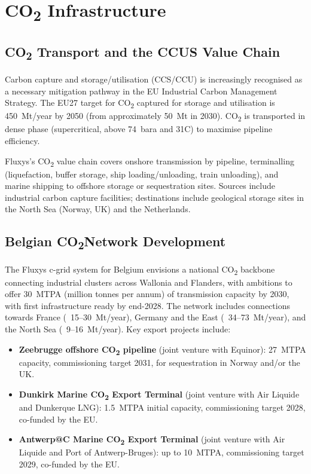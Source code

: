 \section{CO\texorpdfstring{\textsubscript{2}}{2} Infrastructure}

\subsection{CO\texorpdfstring{\textsubscript{2}}{2} Transport and the CCUS Value Chain}

Carbon capture and storage/utilisation (CCS/CCU) is increasingly recognised as a necessary mitigation pathway in the EU Industrial Carbon Management Strategy. The EU27 target for CO\textsubscript{2} captured for storage and utilisation is 450~Mt/year by 2050 (from approximately 50~Mt in 2030). CO\textsubscript{2} is transported in dense phase (supercritical, above 74~bara and 31\textdegree C) to maximise pipeline efficiency.

Fluxys's CO\textsubscript{2} value chain covers onshore transmission by pipeline, terminalling (liquefaction, buffer storage, ship loading/unloading, train unloading), and marine shipping to offshore storage or sequestration sites. Sources include industrial carbon capture facilities; destinations include geological storage sites in the North Sea (Norway, UK) and the Netherlands.

\subsection{Belgian CO\texorpdfstring{\textsubscript{2}}{2}Network Development}

The Fluxys c-grid system for Belgium envisions a national CO\textsubscript{2} backbone connecting industrial clusters across Wallonia and Flanders, with ambitions to offer 30~MTPA (million tonnes per annum) of transmission capacity by 2030, with first infrastructure ready by end-2028. The network includes connections towards France (~15--30~Mt/year), Germany and the East (~34--73~Mt/year), and the North Sea (~9--16~Mt/year). Key export projects include:

\begin{itemize}[noitemsep]
    \item \textbf{Zeebrugge offshore CO\textsubscript{2} pipeline} (joint venture with Equinor): 27~MTPA capacity, commissioning target 2031, for sequestration in Norway and/or the UK.
    \item \textbf{Dunkirk Marine CO\textsubscript{2} Export Terminal} (joint venture with Air Liquide and Dunkerque LNG): 1.5~MTPA initial capacity, commissioning target 2028, co-funded by the EU.
    \item \textbf{Antwerp@C Marine CO\textsubscript{2} Export Terminal} (joint venture with Air Liquide and Port of Antwerp-Bruges): up to 10~MTPA, commissioning target 2029, co-funded by the EU.
\end{itemize}

